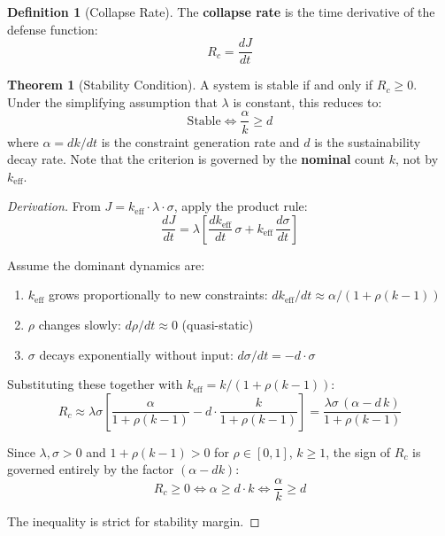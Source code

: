 \documentclass[11pt,a4paper]{article}
\theoremstyle{definition}
\newtheorem{definition}{Definition}[section]
\newtheorem{theorem}{Theorem}[section]
\theoremstyle{remark}
\newcommand{\keff}{k_{\text{eff}}}
\begin{document}
\begin{definition}[Collapse Rate]
The \textbf{collapse rate} is the time derivative of the defense function:
\begin{equation}
R_c = \frac{dJ}{dt}
\end{equation}
\end{definition}

\begin{theorem}[Stability Condition]
\label{thm:stability}
A system is stable if and only if $R_c \geq 0$. Under the simplifying assumption that $\lambda$ is constant, this reduces to:
\begin{equation}
\text{Stable} \iff \frac{\alpha}{k} \geq d
\label{eq:stability}
\end{equation}
where $\alpha = dk/dt$ is the constraint generation rate and $d$ is the sustainability decay rate. Note that the criterion is governed by the \textbf{nominal} count $k$, not by $\keff$.
\end{theorem}

\begin{proof}[Derivation]
From $J = \keff \cdot \lambda \cdot \sigma$, apply the product rule:
\begin{equation}
\frac{dJ}{dt} = \lambda \left[ \frac{d\keff}{dt}\,\sigma + \keff\,\frac{d\sigma}{dt} \right]
\end{equation}

Assume the dominant dynamics are:
\begin{enumerate}[noitemsep,label=(\roman*)]
    \item $\keff$ grows proportionally to new constraints: $d\keff/dt \approx \alpha / (1 + \rho(k-1))$
    \item $\rho$ changes slowly: $d\rho/dt \approx 0$ (quasi-static)
    \item $\sigma$ decays exponentially without input: $d\sigma/dt = -d \cdot \sigma$
\end{enumerate}

Substituting these together with $\keff = k/(1+\rho(k-1))$:
\begin{equation}
R_c \approx \lambda\sigma \left[ \frac{\alpha}{1 + \rho(k-1)} - d \cdot \frac{k}{1 + \rho(k-1)} \right] = \frac{\lambda\sigma\,(\alpha - d\,k)}{1 + \rho(k-1)}
\end{equation}

Since $\lambda, \sigma > 0$ and $1 + \rho(k-1) > 0$ for $\rho \in [0,1]$, $k \geq 1$, the sign of $R_c$ is governed entirely by the factor $(\alpha - dk)$:
\begin{equation}
R_c \geq 0 \iff \alpha \geq d \cdot k \iff \frac{\alpha}{k} \geq d
\end{equation}

The inequality is strict for stability margin.
\end{proof}
\end{document}
